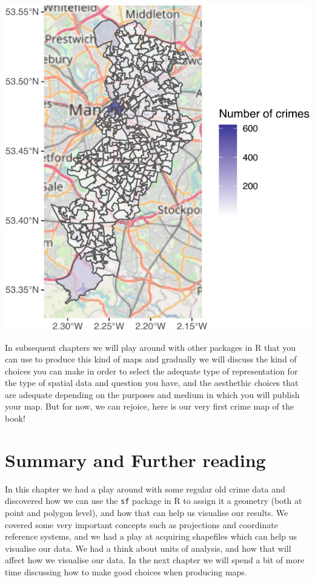 \documentclass[
]{book}
\begin{document}
\includegraphics{crime_mapping_files/figure-latex/unnamed-chunk-31-1.pdf}

In subsequent chapters we will play around with other packages in R that you can use to produce this kind of maps and gradually we will discuss the kind of choices you can make in order to select the adequate type of representation for the type of spatial data and question you have, and the aesthethic choices that are adequate depending on the purposes and medium in which you will publish your map. But for now, we can rejoice, here is our very first crime map of the book!

\hypertarget{summary-and-further-reading}{%
\section{Summary and Further reading}\label{summary-and-further-reading}}

In this chapter we had a play around with some regular old crime data and discovered how we can use the \texttt{sf} package in R to assign it a geometry (both at point and polygon level), and how that can help us visualise our results. We covered some very important concepts such as projections and coordinate reference systems, and we had a play at acquiring shapefiles which can help us visualise our data. We had a think about units of analysis, and how that will affect how we visualise our data. In the next chapter we will spend a bit of more time discussing how to make good choices when producing maps.
\end{document}
